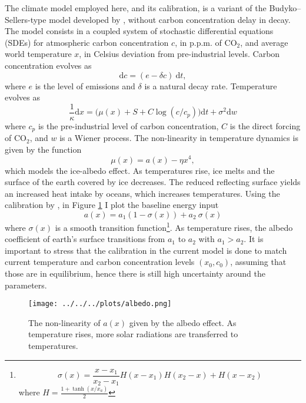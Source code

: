 \documentclass[../../main.tex]{subfiles}
\begin{document}
The climate model employed here, and its calibration, is a variant of the Budyko–Sellers-type model developed by , without carbon concentration delay in decay. The model consists in a coupled system of stochastic differential equations (SDEs) for atmospheric carbon concentration $c$, in p.p.m. of CO$_2$, and average world temperature $x$, in Celsius deviation from pre-industrial levels. Carbon concentration evolves as \begin{equation} \label{eq:climate-model-c}
    \text{d}c = (e - \delta c) \ \text{d} t,
\end{equation} where $e$ is the level of emissions and $\delta$ is a natural decay rate. Temperature evolves as \begin{equation} \label{eq:climate-model-x}
    \frac{1}{\kappa} \text{d}x = \Big( \mu(x) + S + C \log(c / c_p) \Big) \text{d} t + \sigma^2 \text{d}w
\end{equation} where $c_p$ is the pre-industrial level of carbon concentration, $C$ is the direct forcing of CO$_2$, and $w$ is a Wiener process. The non-linearity in temperature dynamics is given by the function \begin{equation}
    \mu(x) = a(x) - \eta x^4,
\end{equation} which models the ice-albedo effect. As temperatures rise, ice melts and the surface of the earth covered by ice decreases. The reduced reflecting surface yields an increased heat intake by oceans, which increases temperatures. Using the calibration by , in Figure \ref{fig:albedo} I plot the baseline energy input\begin{equation}
    a(x) = a_1 (1 - \sigma(x)) + a_2 \ \sigma(x)
\end{equation} where $\sigma(x)$ is a smooth transition function\footnote{
    \begin{equation}
        \sigma(x) = \frac{x - x_1}{x_2 - x_1} H(x - x_1) H(x_2 - x) + H(x - x_2)
    \end{equation}
    where $H = \frac{1 + \tanh(x / x_a)}{2} $
}. As temperature rises, the albedo coefficient of earth's surface transitions from $a_1$ to $a_2$ with $a_1 > a_2$. It is important to stress that the calibration in the current model is done to match current temperature and carbon concentration levels $(x_0, c_0)$, assuming that those are in equilibrium, hence there is still high uncertainty around the parameters.

\begin{figure}[H]
    \centering
    \texttt{[image: ../../../plots/albedo.png]}
    \caption{The non-linearity of $a(x)$ given by the albedo effect. As temperature rises, more solar radiations are transferred to temperatures.}
    \label{fig:albedo}
\end{figure}
\end{document}
